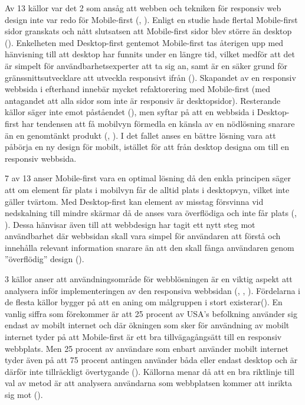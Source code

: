 \documentclass[11pt]{article}
\begin{document}
Av 13 källor var det 2 som ansåg att webben och tekniken för responsiv web design inte var redo för Mobile-first (\cite{cloudfour}, \cite{armstrong}). Enligt en studie hade flertal Mobile-first sidor granskats och nått slutsatsen att Mobile-first sidor blev större än desktop (\cite{cloudfour}). Enkelheten med Desktop-first gentemot Mobile-first tas återigen upp med hänvisning till att desktop har funnits under en längre tid, vilket medför att det är simpelt för användbarhetsexperter att ta sig an, samt är en säker grund för gränssnittsutvecklare att utveckla responsivt ifrån (\cite{armstrong}). Skapandet av en responsiv webbsida i efterhand innebär mycket refaktorering med Mobile-first (med antagandet att alla sidor som inte är responsiv är desktopsidor). Resterande källor säger inte emot påståendet (\cite{neocreo}), men syftar på att en webbsida i Desktop-first har tendensen att få mobilvyn förmedla en känsla av en nödlösning snarare än en genomtänkt produkt (\cite{designshack}, \cite{othermedia}). I det fallet anses en bättre lösning vara att påbörja en ny design för mobilt, istället för att från desktop designa om till en responsiv webbsida.
 
7 av 13 anser Mobile-first vara en optimal lösning då den enkla principen säger att om element får plats i mobilvyn får de alltid plats i desktopvyn, vilket inte gäller tvärtom. Med Desktop-first kan element av misstag försvinna vid nedskalning till mindre skärmar då de anses vara överflödiga och inte får plats (\cite{blogskent}, \cite{responsivedesign}). Dessa hänvisar även till att webbdesign har tagit ett nytt steg mot användbarhet där webbsidan skall vara simpel för användaren att förstå och innehålla relevant information snarare än att den skall fånga användaren genom ”överflödig” design (\cite{blogskent}). 

3 källor anser att användningsområde för webblösningen är en viktig aspekt att analysera inför implementeringen av den responsiva webbsidan (\cite{neocreo}, \cite{marcuspope}, \cite{designshack}). Fördelarna i de flesta källor bygger på att en aning om målgruppen i stort existerar(\cite{zurbword}). En vanlig siffra som förekommer är att 25 procent av USA’s befolkning använder sig endast av mobilt internet och där ökningen som sker för användning av mobilt internet tyder på att Mobile-first är ett bra tillvägagångsätt till en responsiv webbplats.  Men 25 procent av användare som enbart använder mobilt internet tyder även på att 75 procent antingen använder båda eller endast desktop och är därför inte tillräckligt övertygande (\cite{marcuspope}). Källorna menar då att en bra riktlinje till val av metod är att analysera användarna som webbplatsen kommer att inrikta sig mot (\cite{neocreo}). 
\end{document}
